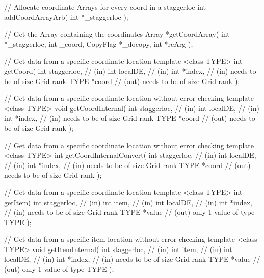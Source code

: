 {{  // Allocate coordinate Arrays for every coord in a staggerloc
  int addCoordArrayArb(
                      int *_staggerloc
                      );
 
  // Get the Array containing the coordinates
  Array *getCoordArray(
                       int *_staggerloc,
                       int _coord,
                       CopyFlag *_docopy,
                       int *rcArg
                       );
 
 
  // Get data from a specific coordinate location
  template <class TYPE> int getCoord(
                                      int staggerloc, // (in)
                                      int localDE,    // (in)
                                      int *index,     // (in)  needs to be of size Grid rank
                                      TYPE *coord     // (out) needs to be of size Grid rank
                                      );
 
  // Get data from a specific coordinate location without error checking 
  template <class TYPE> void getCoordInternal(
                                  int staggerloc, // (in)
                                  int localDE,    // (in)
                                  int *index,     // (in)  needs to be of size Grid rank
                                  TYPE *coord     // (out) needs to be of size Grid rank
                                  );
 
 
  // Get data from a specific coordinate location without error checking 
  template <class TYPE> int getCoordInternalConvert(
                                  int staggerloc, // (in)
                                  int localDE,    // (in)
                                  int *index,     // (in)  needs to be of size Grid rank
                                  TYPE *coord     // (out) needs to be of size Grid rank
                                  );
 
  
  // Get data from a specific coordinate location
  template <class TYPE> int getItem(  
                                      int staggerloc, // (in)
                                      int item,        // (in)
                                      int localDE,    // (in)
                                      int *index,     // (in)  needs to be of size Grid rank
                                      TYPE *value     // (out) only 1 value of type TYPE
                                      );
 
  // Get data from a specific item location without error checking 
  template <class TYPE> void getItemInternal(
                                  int staggerloc, // (in)
                  int item,       // (in)
                                  int localDE,    // (in)
                                  int *index,     // (in)  needs to be of size Grid rank
                                  TYPE *value     // (out) only 1 value of type TYPE
                                  );
 
}}
